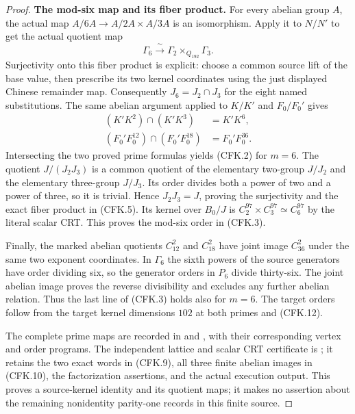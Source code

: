 \begin{proof}
\par\medskip\noindent\textbf{The mod-six map and its fiber product.}\quad
For every abelian group $A$, the actual map
$A/6A\to A/2A\times A/3A$ is an isomorphism.  Apply it to
$N/N'$ to get the actual quotient map
\[
 \Gamma_6\xrightarrow{\ \sim\ }
        \Gamma_2\mathbin{\times}_{Q_{192}}\Gamma_3.
                                                               \tag{CFK.12}
\]
Surjectivity onto this fiber product is explicit: choose a common
source lift of the base value, then prescribe its two kernel
coordinates using the just displayed Chinese remainder map.
Consequently $J_6=J_2\cap J_3$ for the eight named substitutions.
The same abelian argument applied to $K/K'$ and $F_0/F_0'$ gives
\[
 \begin{split}
 (K'K^2)\cap(K'K^3)&=K'K^6,\\
 (F_0'F_0^{12})\cap(F_0'F_0^{18})&=F_0'F_0^{36}.
 \end{split}                                                   \tag{CFK.13}
\]
Intersecting the two proved prime formulas yields (CFK.2) for $m=6$.
The quotient $J/(J_2J_3)$ is a common quotient of the elementary
two-group $J/J_2$ and the elementary three-group $J/J_3$.
Its order divides both a power of two and a power of three, so it is
trivial.  Hence $J_2J_3=J$, proving the surjectivity and the exact
fiber product in (CFK.5).  Its kernel over $B_0/J$ is
$C_2^{97}\times C_3^{97}\simeq C_6^{97}$ by the literal scalar CRT.
This proves the mod-six order in (CFK.3).

Finally, the marked abelian quotients $C_{12}^2$ and $C_{18}^2$
have joint image $C_{36}^2$ under the same two exponent coordinates.
In $\Gamma_6$ the sixth powers of the source generators have order
dividing six, so the generator orders in $P_6$ divide thirty-six.
The joint abelian image proves the reverse divisibility and excludes
any further abelian relation.  Thus the last line of (CFK.3) holds
also for $m=6$.  The target orders follow from the target kernel
dimensions $102$ at both primes and (CFK.12).

The complete prime maps are recorded in
 and
, with their corresponding
vertex and order programs.  The independent lattice and scalar CRT
certificate is ; it retains
the two exact words in (CFK.9), all three finite abelian images in
(CFK.10), the factorization assertions, and the actual execution
output.  This proves a source-kernel identity and its quotient maps;
it makes no assertion about the remaining nonidentity parity-one
records in this finite source.
\end{proof}

